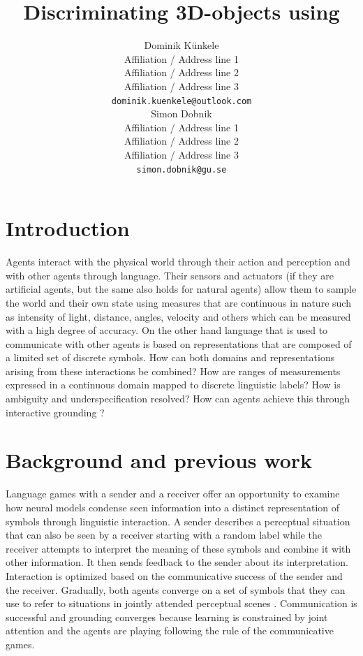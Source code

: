\documentclass[11pt]{article}
\title{Discriminating 3D-objects using }
\author{Dominik Künkele \\
  Affiliation / Address line 1 \\
  Affiliation / Address line 2 \\
  Affiliation / Address line 3 \\
  \texttt{dominik.kuenkele@outlook.com} \\\And
  Simon Dobnik \\
  Affiliation / Address line 1 \\
  Affiliation / Address line 2 \\
  Affiliation / Address line 3 \\
  \texttt{simon.dobnik@gu.se} \\}
\begin{document}
\maketitle
\begin{abstract}

\end{abstract}

\section{Introduction}

Agents interact with the physical world through their action and perception and with other agents through language.
Their sensors and actuators (if they are artificial agents, but the same also holds for natural agents) allow them to sample the world and their own state using measures that are continuous in nature such as intensity of light, distance, angles, velocity and others which can be measured with a high degree of accuracy.
On the other hand language that is used to communicate with other agents is based on representations that are composed of a limited set of discrete symbols.
How can both domains and representations arising from these interactions be combined? How are ranges of measurements expressed in a continuous domain mapped to discrete linguistic labels?
How is ambiguity and underspecification resolved?
How can agents achieve this through interactive grounding \citep{Regier:1996,Roy:2005,Cooper:2023aa}?


\section{Background and previous work}

Language games with a sender and a receiver \citep{Clark:1996aa,Bartlett:2005aa,Kirby:2008ab,SteelsLoetzsch:2009,Zaslavsky:2018aa} offer an opportunity to examine how neural models condense seen information into a distinct representation of symbols through linguistic interaction.
A sender describes a perceptual situation that can also be seen by a receiver starting with a random label while
the receiver attempts to interpret the meaning of these symbols and combine it with other information.
It then sends feedback to the sender about its interpretation.
Interaction is optimized based on the communicative success of the sender and the receiver.
Gradually, both agents converge on a set of symbols that they can use to refer to situations in jointly attended perceptual scenes \citep{Chai:2016aa, Kelleher2020}.
Communication is successful and grounding converges because learning is constrained by joint attention and the agents are playing following the rule of the communicative games.
\end{document}
